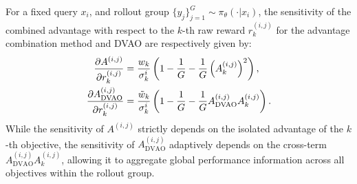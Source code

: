 \begin{proposition}
    For a fixed query $x_i$, and rollout group $\{y_j\}_{j=1}^G \sim \pi_\theta(\cdot | x_i)$, the sensitivity of the combined advantage with  respect to the $k$-th raw reward $r_k^{(i,j)}$ for the advantage combination method and DVAO are respectively given by:
    \begin{align}
        \frac{\partial A^{(i,j)}}{\partial r_k^{(i,j)}} &= \frac{w_k}{\sigma_k^i} \left( 1 - \frac{1}{G} - \frac{1}{G} \left(A_k^{(i,j)}\right)^2 \right), \notag \\
        \frac{\partial A_\text{DVAO}^{(i,j)}}{\partial r_k^{(i,j)}} &= \frac{\tilde{w}_k}{\sigma_k^i} \left( 1 - \frac{1}{G} - \frac{1}{G} A_\text{DVAO}^{(i,j)} A_k^{(i,j)} \right). \notag
    \end{align}
    While the sensitivity of $A^{(i,j)}$ strictly depends on the isolated advantage of the $k$-th objective, the sensitivity of $A_\text{DVAO}^{(i,j)}$ adaptively depends on the cross-term $A_\text{DVAO}^{(i,j)} A_k^{(i,j)}$, allowing it to aggregate global performance information across all objectives within the rollout group.
\end{proposition}
